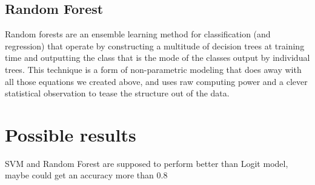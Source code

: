 \documentclass{article}
\begin{document}
\subsection{Random Forest}
Random forests are an ensemble learning method for classification (and regression) that operate by constructing a multitude of decision trees at training time and outputting the class that is the mode of the classes output by individual trees. This technique is a form of non-parametric modeling that does away with all those equations we created above, and uses raw computing power and a clever statistical observation to tease the structure out of the data.



\section{Possible results}

SVM and Random Forest are supposed to perform better than Logit model, maybe could get an accuracy more than 0.8
\end{document}
